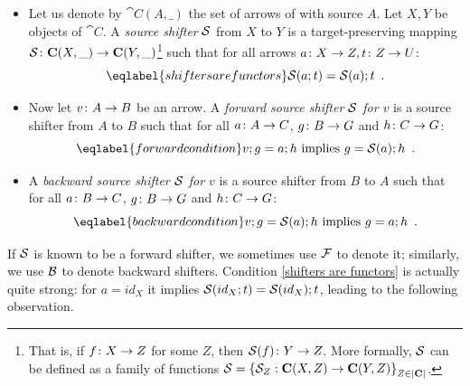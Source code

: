 \begin{definition}\label{def:ab-source shifter}
\begin{itemize}[topsep=\smallskipamount]
\item Let us denote by $\cat{C}(A,\_)$ the set of arrows of  with source $A$. Let $X,Y$ be objects of $\cat{C}$. A \emph{source shifter} $\mathcal{S}$ from $X$ to $Y$ is a target-preserving mapping $\mathcal{S} \colon \mathbf{C}(X,\_) \rightarrow \mathbf{C}(Y, \_)$\footnote{That is, if $f\colon X \rightarrow Z$ for some $Z$, then $\mathcal{S}(f)\colon Y \rightarrow Z$. More formally, $\mathcal{S}$  can be defined as a family of functions $\mathcal{S} = \left\{\mathcal{S}_Z : \mathbf{C}(X, Z) \rightarrow \mathbf{C}(Y, Z)\right\}_{Z\in |\mathbf{C}|}$.} such that for all arrows $a\colon X\rightarrow Z, t\colon Z\rightarrow U$:
%
%
\begin{equation}\eqlabel{shifters are functors}
\cS(a;t) = \cS(a);t \enspace.
\end{equation}
%
\item Now let $v\colon A\rightarrow B$ be an arrow. A \emph{forward source shifter $\mathcal{S}$ for $v$} is a source shifter from $A$ to $B$ such that for all $a\colon A\rightarrow C$, $g\colon B\rightarrow G$ and $h\colon C\rightarrow G$:
%
\begin{equation}\eqlabel{forward condition}
v;g = a;h \text{ implies } g = \cS(a);h \enspace.
\end{equation}
%
\item A \emph{backward source shifter $\mathcal{S}$ for $v$} is a source shifter from $B$ to $A$ such that for all $a\colon B\rightarrow C$, $g\colon B\rightarrow G$ and $h\colon C\rightarrow G$:
%
\begin{equation}\eqlabel{backward condition}
v;g = \cS(a);h \text{ implies } g = a;h \enspace.
\end{equation}
\end{itemize}
\end{definition}
%
If $\mathcal{S}$ is known to be a forward shifter, we sometimes use $\mathcal{F}$ to denote it; similarly, we use $\mathcal{B}$ to denote backward shifters. 
Condition \eqref{shifters are functors} is actually quite strong: for $a = id_X$ it implies $\mathcal{S}(id_X;t) = \mathcal{S}(id_X);t$,  leading to the following observation.

